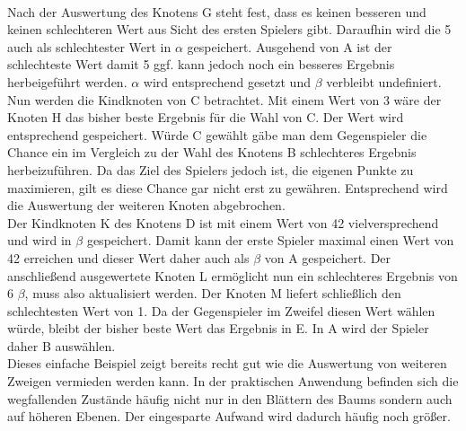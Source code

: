 \\Nach der Auswertung des Knotens G steht fest, dass es keinen besseren und keinen schlechteren Wert aus Sicht des ersten Spielers gibt. Daraufhin wird die 5 auch als schlechtester Wert in $\alpha$ gespeichert. Ausgehend von A  ist der schlechteste Wert damit 5 ggf. kann jedoch noch ein besseres Ergebnis herbeigeführt werden. $\alpha$ wird entsprechend gesetzt und $\beta$ verbleibt undefiniert.\\
Nun werden die Kindknoten von C betrachtet. Mit einem Wert von 3 wäre der Knoten H das bisher beste Ergebnis für die Wahl von C. Der Wert wird entsprechend gespeichert. Würde C gewählt gäbe man dem Gegenspieler die Chance ein im Vergleich zu der Wahl des Knotens B schlechteres Ergebnis herbeizuführen. Da das Ziel des Spielers jedoch ist, die eigenen Punkte zu maximieren, gilt es diese Chance gar nicht erst zu gewähren. Entsprechend wird die Auswertung der weiteren Knoten abgebrochen.\\
Der Kindknoten K des Knotens D ist mit einem Wert von 42 vielversprechend und wird in $\beta$ gespeichert. Damit kann der erste Spieler maximal einen Wert von 42 erreichen und dieser Wert daher auch als $\beta$ von A gespeichert. Der anschließend ausgewertete Knoten L ermöglicht nun ein schlechteres Ergebnis von 6 $\beta$, muss also aktualisiert werden. Der Knoten M liefert schließlich den schlechtesten Wert von 1. Da der Gegenspieler im Zweifel diesen Wert wählen würde, bleibt der bisher beste Wert das Ergebnis in E. In A wird der Spieler daher B auswählen.
\vspace{0.5cm}\\ 
Dieses einfache Beispiel zeigt bereits recht gut wie die Auswertung von weiteren Zweigen vermieden werden kann. In der praktischen Anwendung befinden sich die wegfallenden Zustände häufig nicht nur in den Blättern des Baums sondern auch auf höheren Ebenen. Der eingesparte Aufwand wird dadurch häufig noch größer.  

